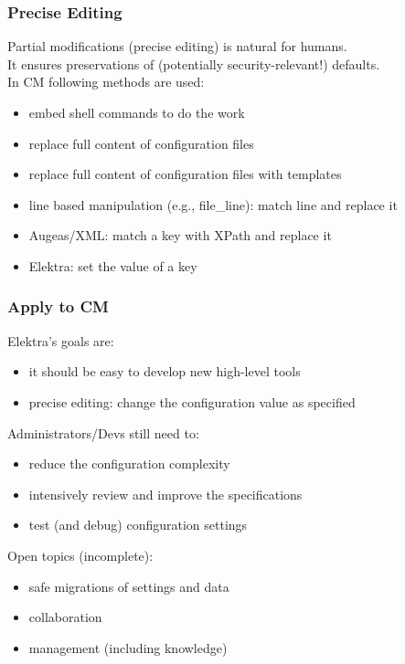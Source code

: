 \begin{frame}
	\frametitle{Precise Editing}

	Partial modifications (precise editing) is natural for humans. \\
	It ensures preservations of (potentially security-relevant!) defaults. \\
	In CM following methods are used:

	\begin{itemize}[<+-| alert@+>]
	\item embed shell commands to do the work
	\item replace full content of configuration files
	\item replace full content of configuration files with templates
	\item line based manipulation (e.g., file\_line): match line and replace it
	\item Augeas/XML: match a key with XPath and replace it
	\item Elektra: set the value of a key
	\end{itemize}
\end{frame}

\begin{frame}
	\frametitle{Apply to CM}

	Elektra's goals are:

	\begin{itemize}[<+-| alert@+>]
	\item it should be easy to develop new high-level tools
	\item precise editing: change the configuration value as specified
	\end{itemize}

	\pause[\thebeamerpauses]  %

	Administrators/Devs still need to:

	\begin{itemize}[<+-| alert@+>]
	\item reduce the configuration complexity
	\item intensively review and improve the specifications
	\item test (and debug) configuration settings
	\end{itemize}

	\pause[\thebeamerpauses]  %

	Open topics (incomplete):

	\begin{itemize}[<+-| alert@+>]
	\item safe migrations of settings and data
	\item collaboration
	\item management (including knowledge)
	\end{itemize}
\end{frame}


